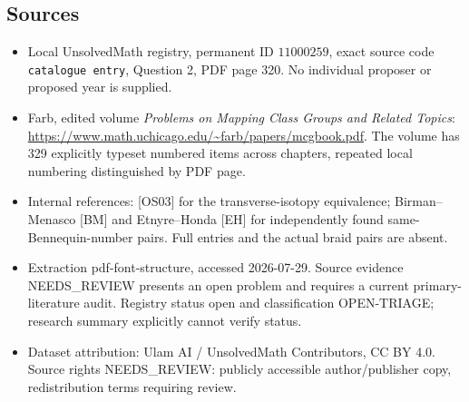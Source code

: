 \documentclass[11pt]{article}
\begin{document}
\subsection{Sources}
\begin{itemize}
\item Local UnsolvedMath registry, permanent ID \(11000259\), exact source code \texttt{catalogue entry}, Question 2, PDF page 320. No individual proposer or proposed year is supplied.
\item Farb, edited volume \emph{Problems on Mapping Class Groups and Related Topics}: \url{https://www.math.uchicago.edu/~farb/papers/mcgbook.pdf}. The volume has 329 explicitly typeset numbered items across chapters, repeated local numbering distinguished by PDF page.
\item Internal references: [OS03] for the transverse-isotopy equivalence; Birman--Menasco [BM] and Etnyre--Honda [EH] for independently found same-Bennequin-number pairs. Full entries and the actual braid pairs are absent.
\item Extraction pdf-font-structure, accessed 2026-07-29. Source evidence NEEDS\_REVIEW presents an open problem and requires a current primary-literature audit. Registry status open and classification OPEN-TRIAGE; research summary explicitly cannot verify status.
\item Dataset attribution: Ulam AI / UnsolvedMath Contributors, CC BY 4.0. Source rights NEEDS\_REVIEW: publicly accessible author/publisher copy, redistribution terms requiring review.
\end{itemize}
\end{document}
